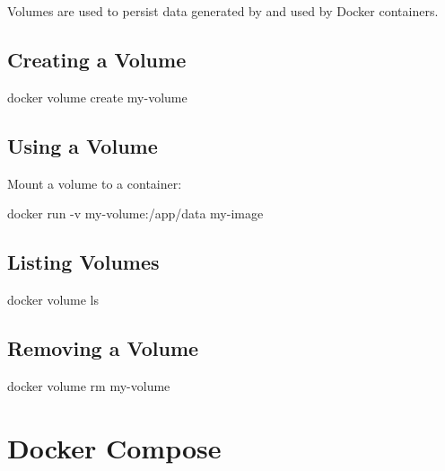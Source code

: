 \documentclass[
  letterpaper,
  DIV=11,
  numbers=noendperiod]{scrreprt}
\newenvironment{Shaded}{\begin{snugshade}}{\end{snugshade}}
\newcommand{\AttributeTok}[1]{\textcolor[rgb]{0.40,0.45,0.13}{#1}}
\newcommand{\ExtensionTok}[1]{\textcolor[rgb]{0.00,0.23,0.31}{#1}}
\newcommand{\NormalTok}[1]{\textcolor[rgb]{0.00,0.23,0.31}{#1}}
\begin{document}
Volumes are used to persist data generated by and used by Docker
containers.

\subsection{Creating a Volume}\label{creating-a-volume}

\begin{Shaded}
\begin{Highlighting}[]
\ExtensionTok{docker}\NormalTok{ volume create my{-}volume}
\end{Highlighting}
\end{Shaded}

\subsection{Using a Volume}\label{using-a-volume}

Mount a volume to a container:

\begin{Shaded}
\begin{Highlighting}[]
\ExtensionTok{docker}\NormalTok{ run }\AttributeTok{{-}v}\NormalTok{ my{-}volume:/app/data my{-}image}
\end{Highlighting}
\end{Shaded}

\subsection{Listing Volumes}\label{listing-volumes}

\begin{Shaded}
\begin{Highlighting}[]
\ExtensionTok{docker}\NormalTok{ volume ls}
\end{Highlighting}
\end{Shaded}

\subsection{Removing a Volume}\label{removing-a-volume}

\begin{Shaded}
\begin{Highlighting}[]
\ExtensionTok{docker}\NormalTok{ volume rm my{-}volume}
\end{Highlighting}
\end{Shaded}

\section{Docker Compose}\label{docker-compose-2}
\end{document}
